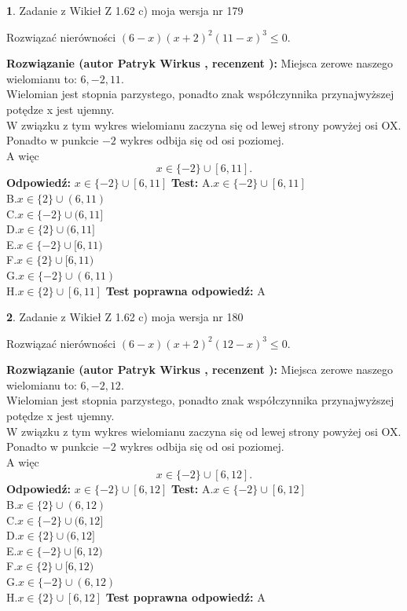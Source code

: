 \documentclass[12pt, a4paper]{article}
\theoremstyle{definition} %
\newtheorem{zad}{}
\newcommand{\zadStart}[1]{\begin{zad}#1\newline}
\newcommand{\zadStop}{\end{zad}}
\newcommand{\rozwStart}[2]{\noindent \textbf{Rozwiązanie (autor #1 , recenzent #2): }\newline}
\newcommand{\rozwStop}{\newline}
\newcommand{\odpStart}{\noindent \textbf{Odpowiedź:}\newline}
\newcommand{\odpStop}{\newline}
\newcommand{\testStart}{\noindent \textbf{Test:}\newline}
\newcommand{\testStop}{\newline}
\newcommand{\kluczStart}{\noindent \textbf{Test poprawna odpowiedź:}\newline}
\newcommand{\kluczStop}{\newline}
\begin{document}
\zadStart{Zadanie z Wikieł Z 1.62 c) moja wersja nr 179}

Rozwiązać nierówności $(6-x)(x+2)^{2}(11-x)^{3}\le0$.
\zadStop
\rozwStart{Patryk Wirkus}{}
Miejsca zerowe naszego wielomianu to: $6, -2, 11$.\\
Wielomian jest stopnia parzystego, ponadto znak współczynnika przy\linebreak najwyższej potędze x jest ujemny.\\ W związku z tym wykres wielomianu zaczyna się od lewej strony powyżej osi OX.\\
Ponadto w punkcie $-2$ wykres odbija się od osi poziomej.\\
A więc $$x \in \{-2\} \cup [6,11].$$
\rozwStop
\odpStart
$x \in \{-2\} \cup [6,11]$
\odpStop
\testStart
A.$x \in \{-2\} \cup [6,11]$\\
B.$x \in \{2\} \cup (6,11)$\\
C.$x \in \{-2\} \cup (6,11]$\\
D.$x \in \{2\} \cup (6,11]$\\
E.$x \in \{-2\} \cup [6,11)$\\
F.$x \in \{2\} \cup [6,11)$\\
G.$x \in \{-2\} \cup (6,11)$\\
H.$x \in \{2\} \cup [6,11]$
\testStop
\kluczStart
A
\kluczStop



\zadStart{Zadanie z Wikieł Z 1.62 c) moja wersja nr 180}

Rozwiązać nierówności $(6-x)(x+2)^{2}(12-x)^{3}\le0$.
\zadStop
\rozwStart{Patryk Wirkus}{}
Miejsca zerowe naszego wielomianu to: $6, -2, 12$.\\
Wielomian jest stopnia parzystego, ponadto znak współczynnika przy\linebreak najwyższej potędze x jest ujemny.\\ W związku z tym wykres wielomianu zaczyna się od lewej strony powyżej osi OX.\\
Ponadto w punkcie $-2$ wykres odbija się od osi poziomej.\\
A więc $$x \in \{-2\} \cup [6,12].$$
\rozwStop
\odpStart
$x \in \{-2\} \cup [6,12]$
\odpStop
\testStart
A.$x \in \{-2\} \cup [6,12]$\\
B.$x \in \{2\} \cup (6,12)$\\
C.$x \in \{-2\} \cup (6,12]$\\
D.$x \in \{2\} \cup (6,12]$\\
E.$x \in \{-2\} \cup [6,12)$\\
F.$x \in \{2\} \cup [6,12)$\\
G.$x \in \{-2\} \cup (6,12)$\\
H.$x \in \{2\} \cup [6,12]$
\testStop
\kluczStart
A
\kluczStop
\end{document}
